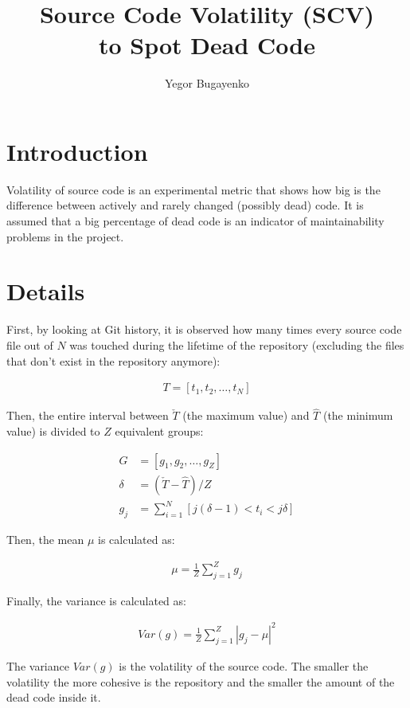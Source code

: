 \documentclass[12pt]{article}
\begin{document}
\title{Source Code Volatility (SCV)\\to Spot Dead Code}
\author{Yegor Bugayenko}
\maketitle

\section{Introduction}

Volatility of source code is an experimental metric that
shows how big is the difference between actively and rarely changed (possibly dead)
code. It is assumed that a big percentage of dead code is
an indicator of maintainability problems in the project.

\section{Details}

First, by looking at Git history,
it is observed how many times every source code file out of $N$ was touched
during the lifetime of the repository (excluding the files that don't exist
in the repository anymore):

\begin{eqnarray}
T = [t_1, t_2, \dots, t_N]
\end{eqnarray}

Then, the entire interval between $\check{T}$ (the maximum value)
and $\hat{T}$ (the minimum value) is divided to $Z$ equivalent groups:

\begin{align}
G &= [g_1, g_2, \dots, g_{Z}] \\
\delta &= ( \check{T} - \hat{T} ) / Z \\
g_j &= \sum_{i=1}^N [ j(\delta-1) < t_i < j\delta ]
\end{align}

Then, the mean $\mu$ is calculated as:

\begin{eqnarray}
\mu = \frac{1}{Z}\sum_{j=1}^{Z}{g_j}
\end{eqnarray}

Finally, the variance is calculated as:

\begin{eqnarray}
Var(g) = \frac{1}{Z}\sum_{j=1}^{Z}{|g_j - \mu|^2}
\end{eqnarray}

The variance $Var(g)$ is the volatility of the source code. The smaller
the volatility the more cohesive is the repository and the smaller
the amount of the dead code inside it.
\end{document}
